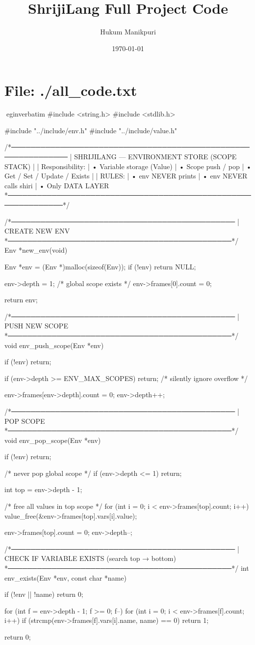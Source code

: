 \documentclass{article}
\title{ShrijiLang Full Project Code}
\author{Hukum Manikpuri}
\date{\today}
\begin{document}
\maketitle
\tableofcontents
\newpage

\section*{File: ./all_code.txt}
egin{verbatim}
#include <string.h>
#include <stdlib.h>

#include "../include/env.h"
#include "../include/value.h"

/*──────────────────────────────────────────────────────────────
 | SHRIJILANG — ENVIRONMENT STORE (SCOPE STACK)
 |
 | Responsibility:
 |   • Variable storage (Value)
 |   • Scope push / pop
 |   • Get / Set / Update / Exists
 |
 | RULES:
 |   • env NEVER prints
 |   • env NEVER calls shiri
 |   • Only DATA LAYER
 *──────────────────────────────────────────────────────────────*/

/*──────────────────────────────────────────────
 | CREATE NEW ENV
 *──────────────────────────────────────────────*/
Env *new_env(void)
{
    Env *env = (Env *)malloc(sizeof(Env));
    if (!env) return NULL;

    env->depth = 1; /* global scope exists */
    env->frames[0].count = 0;

    return env;
}

/*──────────────────────────────────────────────
 | PUSH NEW SCOPE
 *──────────────────────────────────────────────*/
void env_push_scope(Env *env)
{
    if (!env) return;

    if (env->depth >= ENV_MAX_SCOPES) {
        return; /* silently ignore overflow */
    }

    env->frames[env->depth].count = 0;
    env->depth++;
}

/*──────────────────────────────────────────────
 | POP SCOPE
 *──────────────────────────────────────────────*/
void env_pop_scope(Env *env)
{
    if (!env) return;

    /* never pop global scope */
    if (env->depth <= 1) return;

    int top = env->depth - 1;

    /* free all values in top scope */
    for (int i = 0; i < env->frames[top].count; i++) {
        value_free(&env->frames[top].vars[i].value);
    }

    env->frames[top].count = 0;
    env->depth--;
}

/*──────────────────────────────────────────────
 | CHECK IF VARIABLE EXISTS (search top → bottom)
 *──────────────────────────────────────────────*/
int env_exists(Env *env, const char *name)
{
    if (!env || !name) return 0;

    for (int f = env->depth - 1; f >= 0; f--) {
        for (int i = 0; i < env->frames[f].count; i++) {
            if (strcmp(env->frames[f].vars[i].name, name) == 0) {
                return 1;
            }
        }
    }

    return 0;
}
\end{document}
